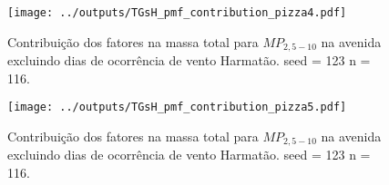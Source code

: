 \begin{landscape}
  \begin{figure}
    \centering
    \begin{minipage}[b]{0.45\linewidth}
      \texttt{[image: ../outputs/TGsH\_pmf\_contribution\_pizza4.pdf]}
      \caption{Contribuição dos fatores na massa total para $MP_{2,5-10}$ na avenida
               excluindo dias de ocorrência de vento Harmatão. seed = 123 n = 116.
               \label{fig:TGsH_contribution4}}
    \end{minipage}%
    \hspace{0.5cm}
    \begin{minipage}[b]{0.45\linewidth}
      
    \end{minipage}
  \end{figure}
\end{landscape}

\begin{landscape}
  \begin{figure}
    \centering
    \begin{minipage}[b]{0.45\linewidth}
      \texttt{[image: ../outputs/TGsH\_pmf\_contribution\_pizza5.pdf]}
      \caption{Contribuição dos fatores na massa total para $MP_{2,5-10}$ na avenida
               excluindo dias de ocorrência de vento Harmatão. seed = 123 n = 116.
               \label{fig:TGsH_contribution5}}
    \end{minipage}%
    \hspace{0.5cm}
    \begin{minipage}[b]{0.45\linewidth}
      
    \end{minipage}
  \end{figure}
\end{landscape}


